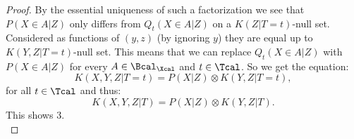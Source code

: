 \begin{Thm}
\begin{proof}
By the essential uniqueness of such a factorization we see that $P(X \in A|Z)$ only differs from $Q_t(X \in A|Z)$ on a $K(Z|T=t)$-null set. Considered as functions of $(y,z)$ (by ignoring $y$) they are equal up to $K(Y,Z|T=t)$-null set. This means that we can replace $Q_t(X \in A|Z)$ with $P(X\in A|Z)$ for every $A \in \Bcal_\Xcal$ and $t \in \Tcal$. So we get the equation:
        \[ K(X,Y,Z|T=t) = P(X|Z) \otimes K(Y,Z|T=t),  \]
        for all $t \in \Tcal$ and thus:
  \[ K(X,Y,Z|T) = P(X|Z) \otimes K(Y,Z|T).  \]
  This shows 3.\\ 

\end{proof}
\end{Thm}

